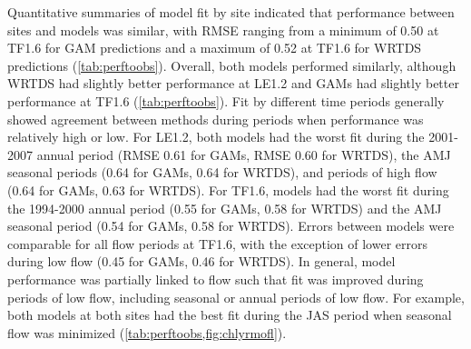 \documentclass{svjour3}\usepackage[]{graphicx}\usepackage[]{color}
\begin{document}
Quantitative summaries of model fit by site indicated that performance between sites and models was similar, with \ac{RMSE} ranging from a minimum of 0.50 at TF1.6 for \ac{GAM} predictions and a maximum of 0.52 at TF1.6 for \ac{WRTDS} predictions (\cref{tab:perftoobs}).  Overall, both models performed similarly, although \ac{WRTDS} had slightly better performance at LE1.2 and \acp{GAM} had slightly better performance at TF1.6 (\cref{tab:perftoobs}).  Fit by different time periods generally showed agreement between methods during periods when performance was relatively high or low.  For LE1.2, both models had the worst fit during the 2001-2007 annual period (\ac{RMSE} 0.61 for \acp{GAM}, \ac{RMSE} 0.60 for \ac{WRTDS}), the \ac{AMJ} seasonal periods (0.64 for \acp{GAM}, 0.64 for \ac{WRTDS}), and periods of high flow (0.64 for \acp{GAM}, 0.63 for \ac{WRTDS}).  For TF1.6, models had the worst fit during the 1994-2000 annual period (0.55 for \acp{GAM}, 0.58 for \ac{WRTDS}) and the \ac{AMJ} seasonal period (0.54 for \acp{GAM}, 0.58 for \ac{WRTDS}).  Errors between models were comparable for all flow periods at TF1.6, with the exception of lower errors during low flow (0.45 for \acp{GAM}, 0.46 for \ac{WRTDS}).  In general, model performance was partially linked to flow such that fit was improved during periods of low flow, including seasonal or annual periods of low flow.  For example, both models at both sites had the best fit during the \ac{JAS} period when seasonal flow was minimized (\cref{tab:perftoobs,fig:chlyrmofl}).
\end{document}

